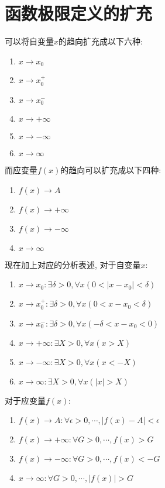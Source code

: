 \section{函数极限定义的扩充}
可以将自变量$x$的趋向扩充成以下六种:
\begin{enumerate}
    \item $x \to x_0$
    \item $x \to x_0^+$
    \item $x \to x_0^-$
    \item $x \to +\infty$
    \item $x \to -\infty$
    \item $x \to \infty$
\end{enumerate}
而应变量$f(x)$的趋向可以扩充成以下四种:
\begin{enumerate}
    \item $f(x) \to A$
    \item $f(x) \to +\infty$
    \item $f(x) \to -\infty$
    \item $x \to \infty$
\end{enumerate}
现在加上对应的分析表述, 对于自变量$x$:
\begin{enumerate}
    \item $x \to x_0: \exists \delta > 0, \forall x(0 < \left| x - x_0 \right| < \delta)$
    \item $x \to x_0^+: \exists \delta > 0, \forall x(0 < x - x_0 < \delta)$
    \item $x \to x_0^-: \exists \delta > 0, \forall x(-\delta < x - x_0 < 0)$
    \item $x \to +\infty: \exists X > 0, \forall x(x > X)$
    \item $x \to -\infty: \exists X > 0, \forall x(x < -X)$
    \item $x \to \infty: \exists X > 0, \forall x(\left| x \right| > X)$
\end{enumerate}
对于应变量$f(x)$: 
\begin{enumerate}
    \item $f(x) \to A: \forall \epsilon > 0, \cdots,\left| f(x) - A \right| < \epsilon$
    \item $f(x) \to +\infty: \forall G > 0, \cdots, f(x) > G$
    \item $f(x) \to -\infty: \forall G > 0, \cdots, f(x) < -G$
    \item $x \to \infty: \forall G > 0, \cdots, \left| f(x) \right| > G$
\end{enumerate}


